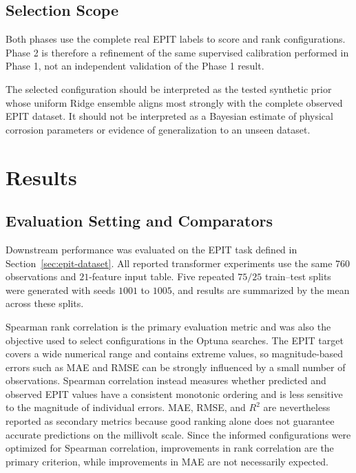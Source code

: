 \documentclass{article}
\begin{document}
\subsection{Selection Scope}

Both phases use the complete real EPIT labels to score and rank configurations. Phase 2 is therefore a refinement of the same supervised calibration performed in Phase 1, not an independent validation of the Phase 1 result.

The selected configuration should be interpreted as the tested synthetic prior whose uniform Ridge ensemble aligns most strongly with the complete observed EPIT dataset. It should not be interpreted as a Bayesian estimate of physical corrosion parameters or evidence of generalization to an unseen dataset.

\section{Results}
\label{sec:results}

\subsection{Evaluation Setting and Comparators}
\label{sec:results-evaluation}

Downstream performance was evaluated on the EPIT task defined in Section~\ref{sec:epit-dataset}. All reported transformer experiments use the same \(760\) observations and \(21\)-feature input table. Five repeated \(75/25\) train--test splits were generated with seeds \(1001\) to \(1005\), and results are summarized by the mean across these splits.

Spearman rank correlation is the primary evaluation metric and was also the objective used to select configurations in the Optuna searches. The EPIT target covers a wide numerical range and contains extreme values, so magnitude-based errors such as MAE and RMSE can be strongly influenced by a small number of observations. Spearman correlation instead measures whether predicted and observed EPIT values have a consistent monotonic ordering and is less sensitive to the magnitude of individual errors. MAE, RMSE, and \(R^2\) are nevertheless reported as secondary metrics because good ranking alone does not guarantee accurate predictions on the millivolt scale. Since the informed configurations were optimized for Spearman correlation, improvements in rank correlation are the primary criterion, while improvements in MAE are not necessarily expected.
\end{document}
